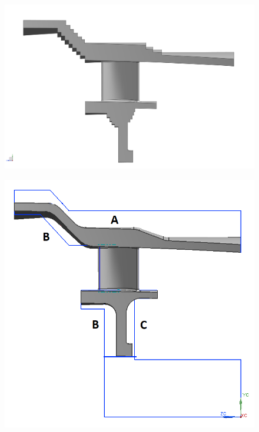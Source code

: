 \begin{figure}[H]
\centering
\begin{minipage}{.5\textwidth}
  \centering
  \includegraphics[width=1\linewidth]{Figures/manufacturingpart1.png}
  \label{fig:premachining}
\end{minipage}%
\begin{minipage}{.5\textwidth}
  \centering
  \includegraphics[width=.8\linewidth]{Figures/statormanu2.png}
  \label{fig:finishedmanu}
\end{minipage}
\end{figure}

\newpage
